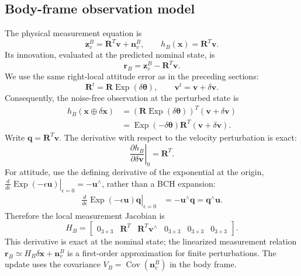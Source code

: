 \documentclass[11pt]{article}
\newcommand{\R}{\mathbf{R}}
\newcommand{\vct}{\mathbf{v}}
\newcommand{\Exp}{\operatorname{Exp}}
\newcommand{\skewop}[1]{#1^{\wedge}}
\begin{document}
\subsection{Body-frame observation model}
The physical measurement equation is
\begin{equation}
\boxed{\bm z_v^B=\R^T\vct+\bm n_v^B,\qquad h_B(\bm x)=\R^T\vct.}
\end{equation}
Its innovation, evaluated at the predicted nominal state, is
\begin{equation}
\bm r_B=\bm z_v^B-\R^T\vct.
\end{equation}
We use the same right-local attitude error as in the preceding sections:
\begin{equation}
\R^t=\R\Exp(\delta\bm\theta),\qquad
\vct^t=\vct+\delta\bm v.
\end{equation}
Consequently, the noise-free observation at the perturbed state is
\begin{align}
h_B(\bm x\oplus\delta\bm x)
&=(\R\Exp(\delta\bm\theta))^T(\vct+\delta\bm v)\\
&=\Exp(-\delta\bm\theta)\R^T(\vct+\delta\bm v).
\end{align}
Write $\bm q=\R^T\vct$. The derivative with respect to the velocity
perturbation is exact:
\begin{equation}
\left.\frac{\partial h_B}{\partial\delta\bm v}\right|_0=\R^T.
\end{equation}
For attitude, use the defining derivative of the exponential at the origin,
$\left.\frac{d}{d\epsilon}\Exp(-\epsilon\bm u)\right|_{\epsilon=0}
=-\skewop{\bm u}$, rather than a BCH expansion:
\begin{align}
\left.\frac{d}{d\epsilon}\Exp(-\epsilon\bm u)\bm q\right|_{\epsilon=0}
&=-\skewop{\bm u}\bm q
=\skewop{\bm q}\bm u.
\end{align}
Therefore the local measurement Jacobian is
\begin{equation}
\boxed{
H_B=\begin{bmatrix}
0_{3\times3}&\R^T&\skewop{\R^T\vct}&0_{3\times3}&0_{3\times3}&0_{3\times3}
\end{bmatrix}.}
\end{equation}
This derivative is exact at the nominal state; the linearized measurement
relation $\bm r_B\simeq H_B\delta\bm x+\bm n_v^B$ is a first-order
approximation for finite perturbations. The update uses the covariance
$V_B=\operatorname{Cov}(\bm n_v^B)$ in the body frame.
\end{document}
